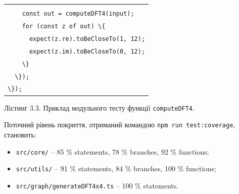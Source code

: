 \documentclass[
]{article}
\newcommand{\passthrough}[1]{#1}
\begin{document}
{\begin{longtable}[]{@{}
  >{\raggedright\arraybackslash}p{}@{}}
\begin{minipage}[t]{\linewidth}
\passthrough{\lstinline!    !}\passthrough{\lstinline!];!}\strut \\
\passthrough{\lstinline!    !}\passthrough{\lstinline!const!}\passthrough{\lstinline! !}\passthrough{\lstinline!out!}\passthrough{\lstinline! !}\passthrough{\lstinline!=!}\passthrough{\lstinline! !}\passthrough{\lstinline!computeDFT4(input);!}\strut \\
\passthrough{\lstinline!    !}\passthrough{\lstinline!for!}\passthrough{\lstinline! !}\passthrough{\lstinline!(const!}\passthrough{\lstinline! !}\passthrough{\lstinline!z!}\passthrough{\lstinline! !}\passthrough{\lstinline!of!}\passthrough{\lstinline! !}\passthrough{\lstinline!out)!}\passthrough{\lstinline! !}\passthrough{\lstinline!\{!}\strut \\
\passthrough{\lstinline!      !}\passthrough{\lstinline!expect(z.re).!}\passthrough{\lstinline!toBeCloseTo!}\passthrough{\lstinline!(1,!}\passthrough{\lstinline! !}\passthrough{\lstinline!12);!}\strut \\
\passthrough{\lstinline!      !}\passthrough{\lstinline!expect(z.im).!}\passthrough{\lstinline!toBeCloseTo!}\passthrough{\lstinline!(0,!}\passthrough{\lstinline! !}\passthrough{\lstinline!12);!}\strut \\
\passthrough{\lstinline!    !}\passthrough{\lstinline!\}!}\strut \\
\passthrough{\lstinline!  !}\passthrough{\lstinline!\});!}\strut \\
\passthrough{\lstinline!\});!}\strut
\end{minipage} \\
\end{longtable}
}

Лістинг 3.3. Приклад модульного тесту функції
\passthrough{\lstinline!computeDFT!}\passthrough{\lstinline!4!}.

Поточний рівень покриття, отриманий командою
\passthrough{\lstinline!npm!}\passthrough{\lstinline! !}\passthrough{\lstinline!run!}\passthrough{\lstinline! !}\passthrough{\lstinline!test!}\passthrough{\lstinline!:!}\passthrough{\lstinline!coverage!},
становить:

\begin{itemize}
\item
  \passthrough{\lstinline!src!}\passthrough{\lstinline!/core/!} -- 85 \%
  statements, 78 \% branches, 92 \% functions;
\item
  \passthrough{\lstinline!src!}\passthrough{\lstinline!/utils/!} -- 91
  \% statements, 84 \% branches, 100 \% functions;
\item
  \passthrough{\lstinline!src!}\passthrough{\lstinline!/graph/generateDFT4x4.ts!}
  -- 100 \% statements.
\end{itemize}
\end{document}
